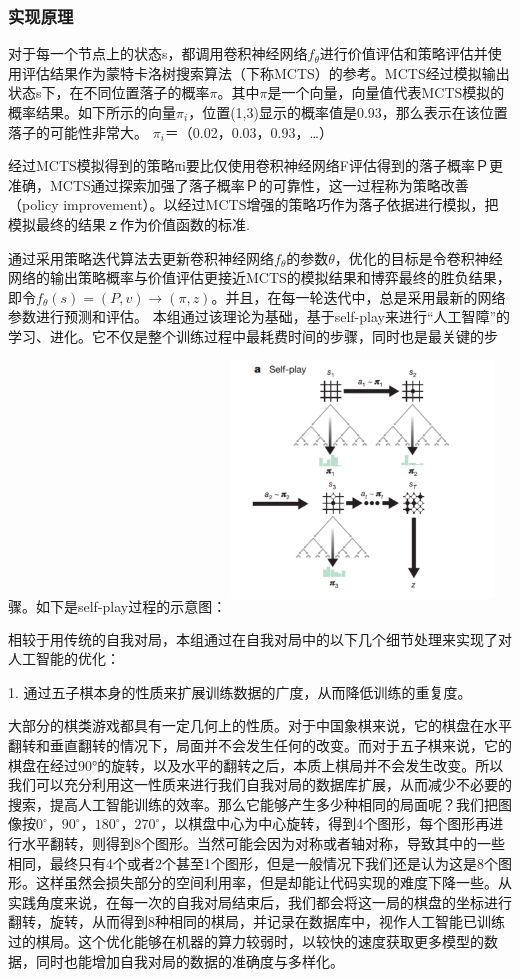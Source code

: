 \documentclass[a4paper]{article}
\begin{document}
\begin{multicols}{2}
\subsubsection{实现原理}
对于每一个节点上的状态s，都调用卷积神经网络$f_\theta$进行价值评估和策略评估并使用评估结果作为蒙特卡洛树搜索算法（下称MCTS）的参考。MCTS经过模拟输出状态s下，在不同位置落子的概率$\pi$。其中$\pi$是一个向量，向量值代表MCTS模拟的概率结果。如下所示的向量$\pi_i$，位置(1,3)显示的概率值是0.93，那么表示在该位置落子的可能性非常大。\nextline
$\pi_i$＝（0.02，0.03，0.93，…）
\par
经过MCTS模拟得到的策略πi要比仅使用卷积神经网络F评估得到的落子概率Ｐ更准确，MCTS通过探索加强了落子概率Ｐ的可靠性，这一过程称为策略改善（policy improvement）。以经过MCTS增强的策略巧作为落子依据进行模拟，把模拟最终的结果ｚ作为价值函数的标准.\par
通过采用策略迭代算法去更新卷积神经网络$f_\theta$的参数$\theta$，优化的目标是令卷积神经网络的输出策略概率与价值评估更接近MCTS的模拟结果和博弈最终的胜负结果，即令$f_\theta(s)=(P,v)\rightarrow(\pi,z)$。并且，在每一轮迭代中，总是采用最新的网络参数进行预测和评估。\cite{k7}
本组通过该理论为基础，基于self-play来进行“人工智障”的学习、进化。它不仅是整个训练过程中最耗费时间的步骤，同时也是最关键的步骤。如下是self-play过程的示意图：
\includegraphics[width=7cm,height=7cm]{AI1.png}
\par
相较于用传统的自我对局，本组通过在自我对局中的以下几个细节处理来实现了对人工智能的优化：\par
1. 通过五子棋本身的性质来扩展训练数据的广度，从而降低训练的重复度。\par
大部分的棋类游戏都具有一定几何上的性质。对于中国象棋来说，它的棋盘在水平翻转和垂直翻转的情况下，局面并不会发生任何的改变。而对于五子棋来说，它的棋盘在经过90°的旋转，以及水平的翻转之后，本质上棋局并不会发生改变。所以我们可以充分利用这一性质来进行我们自我对局的数据库扩展，从而减少不必要的搜索，提高人工智能训练的效率。那么它能够产生多少种相同的局面呢？我们把图像按$0^{\circ}$，$90^{\circ}$，$180^{\circ}$，$270^{\circ}$，以棋盘中心为中心旋转，得到4个图形，每个图形再进行水平翻转，则得到8个图形。当然可能会因为对称或者轴对称，导致其中的一些相同，最终只有4个或者2个甚至1个图形，但是一般情况下我们还是认为这是8个图形。\cite{k8}这样虽然会损失部分的空间利用率，但是却能让代码实现的难度下降一些。从实践角度来说，在每一次的自我对局结束后，我们都会将这一局的棋盘的坐标进行翻转，旋转，从而得到8种相同的棋局，并记录在数据库中，视作人工智能已训练过的棋局。这个优化能够在机器的算力较弱时，以较快的速度获取更多模型的数据，同时也能增加自我对局的数据的准确度与多样化。\par

\end{multicols}
\end{document}
